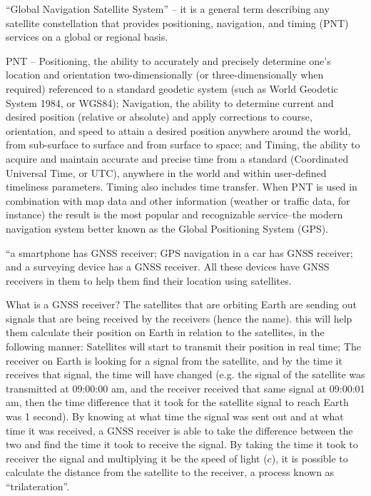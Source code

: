 
“Global Navigation Satellite System” -- it is a general term describing any satellite constellation that provides positioning, navigation, and timing (PNT) services on a global or regional basis.

    PNT -- Positioning, the ability to accurately and precisely determine one's location and orientation two-dimensionally (or three-dimensionally when required) referenced to a standard geodetic system (such as World Geodetic System 1984, or WGS84);
    Navigation, the ability to determine current and desired position (relative or absolute) and apply corrections to course, orientation, and speed to attain a desired position anywhere around the world, from sub-surface to surface and from surface to space; and
    Timing, the ability to acquire and maintain accurate and precise time from a standard (Coordinated Universal Time, or UTC), anywhere in the world and within user-defined timeliness parameters. Timing also includes time transfer.
    When PNT is used in combination with map data and other information (weather or traffic data, for instance) the result is the most popular and recognizable service--the modern navigation system better known as the Global Positioning System (GPS).

“a smartphone has GNSS receiver; GPS navigation in a car has GNSS receiver; and a surveying device has a GNSS receiver. All these devices have GNSS receivers in them to help them find their location using satellites.

What is a GNSS receiver?
The satellites that are orbiting Earth are sending out signals that are being received by the receivers (hence the name). this will help them calculate their position on Earth in relation to the satellites, in the following manner:
	Satellites will start to transmit their position in real time;
	The receiver on Earth is looking for a signal from the satellite, and by the time it receives that signal, the time will have changed (e.g. the signal of the satellite was transmitted at 09:00:00 am, and the receiver received that same signal at 09:00:01 am, then the time difference that it took for the satellite signal to reach Earth was 1 second). By knowing at what time the signal was sent out and at what time it was received, a GNSS receiver is able to take the difference between the two and find the time it took to receive the signal. By taking the time it took to receiver the signal and multiplying it be the speed of light ($c$), it is possible to calculate the distance from the satellite to the receiver, a process known as ``trilateration''.


